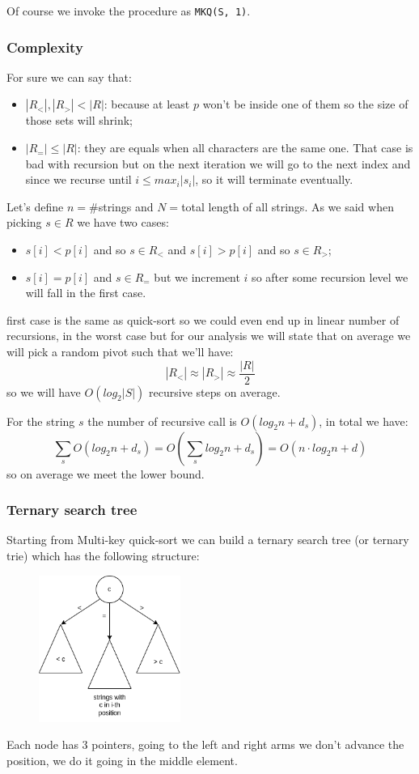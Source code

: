 Of course we invoke the procedure as \verb|MKQ(S, 1)|.

\subsubsection{Complexity}
For sure we can say that:
\begin{itemize}
    \item $|R_<|, |R_>| < |R|$: because at least $p$ won't be inside one of them so the size of those sets will shrink;

    \item $|R_=| \leq |R|$: they are equals when all characters are the same one. That case is bad with recursion but on the next iteration we will go to the next index and since we recurse until $i \leq max_i |s_i|$, so it will terminate eventually.
\end{itemize}
Let's define $n = \#$strings and $N = $total length of all strings.
As we said when picking $s \in R$ we have two cases:
\begin{itemize}
    \item $s[i] < p[i]$ and so $s \in R_<$ and $s[i] > p[i]$ and so $s \in R_>$;
    \item $s[i] = p[i]$ and $s \in R_=$ but we increment $i$ so after some recursion level we will fall in the first case.
\end{itemize}
first case is the same as quick-sort so we could even end up in linear number of recursions, in the worst case but for our analysis we will state that on average we will pick a random pivot such that we'll have:
$$
    |R_<| \approx |R_>| \approx \frac{|R|}{2}
$$
so we will have $O(log_2 |S|)$ recursive steps on average.

For the string $s$ the number of recursive call is $O(log_2n + d_s)$, in total we have:
$$
    \sum_s O(log_2 n + d_s) = O\left( \sum_s log_2 n + d_s \right) = O(n \cdot log_2 n + d)
$$
so on average we meet the lower bound.

\subsubsection{Ternary search tree}
Starting from Multi-key quick-sort we can build a ternary search tree (or ternary trie) which has the following structure:
\begin{figure}[H]
    \centering
    \includegraphics[width=175px]{images/5_String_sorting/ternary_search_tree.png}
\end{figure}
Each node has 3 pointers, going to the left and right arms we don't advance the position, we do it going in the middle element.

